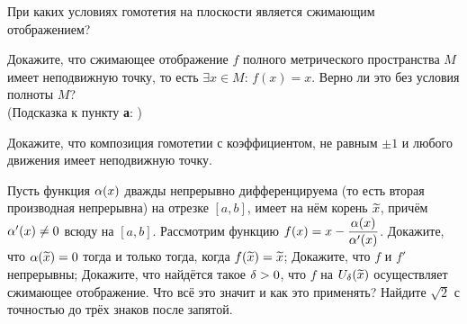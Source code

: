 \documentclass[a4paper,12pt]{article}
\begin{document}
При каких условиях гомотетия на плоскости является сжимающим отображением?

Докажите, что сжимающее отображение $f$ полного метрического пространства $M$ имеет неподвижную точку, то есть $\exi x\in M$: $f(x)=x$.
Верно ли это без условия полноты $M$?\\
(Подсказка к пункту \textbf{а}:\,\,{})

Докажите, что композиция гомотетии с коэффициентом, не равным $\pm 1$ и любого движения имеет неподвижную точку.

Пусть функция $\alpha(x)$ дважды непрерывно дифференцируема (то есть вторая производная непрерывна) на отрезке $[a,b]$, имеет на нём корень $\widetilde{x}$, причём $\alpha'(x)\ne0$ всюду на $[a,b]$.
Рассмотрим функцию $f(x) =  x - \dfrac{\alpha(x)}{\alpha'(x)}$.
Докажите, что $\alpha(\widetilde{x}) = 0$ тогда и только тогда, когда $f(\widetilde{x})=\widetilde{x}$;
Докажите, что $f$ и $f'$ непрерывны;
Докажите, что найдётся такое $\delta>0$, что $f$ на $U_\delta(\widetilde{x})$ осуществляет сжимающее отображение.
Что всё это значит и как это применять?
Найдите $\sqrt{2}$ с точностью до трёх знаков после запятой.

\end{document}

